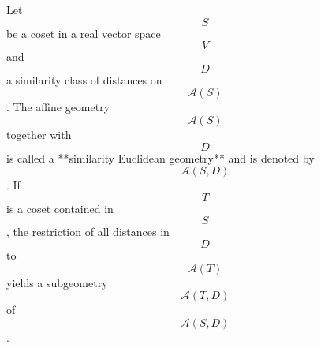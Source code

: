 Let $$S$$ be a coset in a real vector space $$V$$ and $$D$$ a similarity class of distances on $$\mathcal{A}(S)$$. The affine geometry $$\mathcal{A}(S)$$ together with $$D$$ is called a **similarity Euclidean geometry** and is denoted by $$\mathcal{A}(S, D)$$.
If $$T$$ is a coset contained in $$S$$, the restriction of all distances in $$D$$ to $$\mathcal{A}(T)$$ yields a subgeometry $$\mathcal{A}(T, D)$$ of $$\mathcal{A}(S, D)$$.
